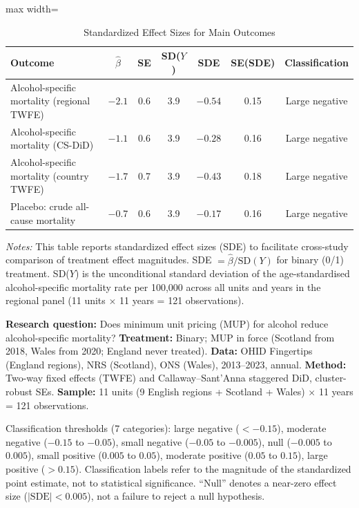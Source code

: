 \begin{table}[H]
\centering
\caption{Standardized Effect Sizes for Main Outcomes}
\label{tab:sde}
\begin{adjustbox}{max width=\textwidth}
\begin{tabular}{lcccccc}
\toprule
Outcome & $\hat{\beta}$ & SE & SD($Y$) & SDE & SE(SDE) & Classification \\
\midrule
Alcohol-specific mortality (regional TWFE) & $-2.1$ & 0.6 & 3.9 & $-0.54$ & 0.15 & Large negative \\
Alcohol-specific mortality (CS-DiD) & $-1.1$ & 0.6 & 3.9 & $-0.28$ & 0.16 & Large negative \\
Alcohol-specific mortality (country TWFE) & $-1.7$ & 0.7 & 3.9 & $-0.43$ & 0.18 & Large negative \\
Placebo: crude all-cause mortality & $-0.7$ & 0.6 & 3.9 & $-0.17$ & 0.16 & Large negative \\
\bottomrule
\end{tabular}
\end{adjustbox}
\par\vspace{0.3em}
{\footnotesize \emph{Notes:} This table reports standardized effect sizes (SDE) to facilitate cross-study comparison of treatment effect magnitudes. SDE $= \hat{\beta} / \text{SD}(Y)$ for binary (0/1) treatment. SD($Y$) is the unconditional standard deviation of the age-standardised alcohol-specific mortality rate per 100,000 across all units and years in the regional panel (11 units $\times$ 11 years = 121 observations).

\textbf{Research question:} Does minimum unit pricing (MUP) for alcohol reduce alcohol-specific mortality?
\textbf{Treatment:} Binary; MUP in force (Scotland from 2018, Wales from 2020; England never treated).
\textbf{Data:} OHID Fingertips (England regions), NRS (Scotland), ONS (Wales), 2013--2023, annual.
\textbf{Method:} Two-way fixed effects (TWFE) and Callaway--Sant'Anna staggered DiD, cluster-robust SEs.
\textbf{Sample:} 11 units (9 English regions + Scotland + Wales) $\times$ 11 years = 121 observations.

Classification thresholds (7 categories): large negative ($< -0.15$), moderate negative ($-0.15$ to $-0.05$), small negative ($-0.05$ to $-0.005$), null ($-0.005$ to $0.005$), small positive ($0.005$ to $0.05$), moderate positive ($0.05$ to $0.15$), large positive ($> 0.15$). Classification labels refer to the magnitude of the standardized point estimate, not to statistical significance. ``Null'' denotes a near-zero effect size ($|\text{SDE}| < 0.005$), not a failure to reject a null hypothesis.}
\end{table}

